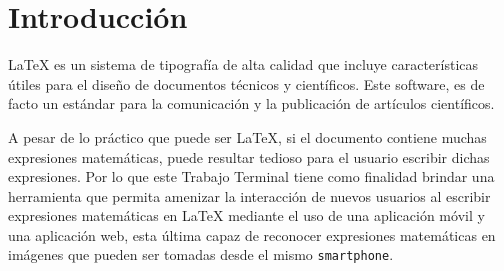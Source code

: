 \chapter{Introducción}




\LaTeX{} es un sistema de tipografía de alta calidad que incluye características útiles para el diseño de documentos técnicos y científicos. Este software, es de facto un estándar para la comunicación y la publicación de artículos científicos. %
\bigskip

A pesar de lo práctico que puede ser \LaTeX{}, si el documento contiene muchas expresiones matemáticas, puede resultar tedioso para el usuario escribir dichas expresiones. Por lo que este Trabajo Terminal tiene como finalidad brindar una herramienta que permita amenizar la interacción de nuevos usuarios al escribir expresiones matemáticas en \LaTeX{} mediante el uso de una aplicación móvil y una aplicación web, esta última capaz de reconocer expresiones matemáticas en imágenes que pueden ser tomadas desde el mismo \texttt{smartphone}.
\bigskip


